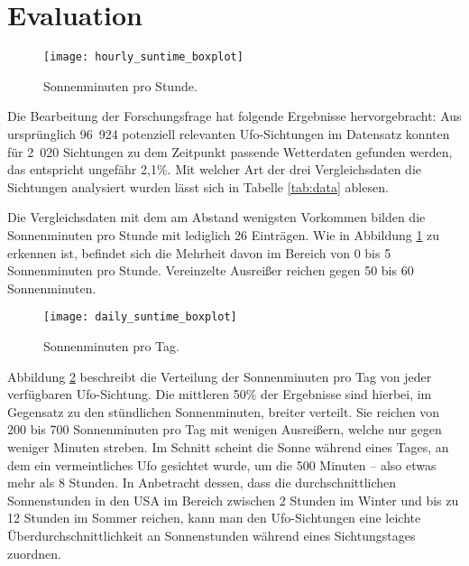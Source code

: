 \section{Evaluation} \label{evaluation}

\begin{figure}[t]
    \centering
    \texttt{[image: hourly\_suntime\_boxplot]}
    \caption{Sonnenminuten pro Stunde.}
    \label{fig:hourly_suntime}
\end{figure}

Die Bearbeitung der Forschungsfrage hat folgende Ergebnisse hervorgebracht: Aus ursprünglich 96~924 potenziell relevanten Ufo-Sichtungen im Datensatz konnten für 2~020 Sichtungen zu dem Zeitpunkt passende Wetterdaten gefunden werden, das entspricht ungefähr 2,1\%. Mit welcher Art der drei Vergleichsdaten die Sichtungen analysiert wurden lässt sich in Tabelle \ref{tab:data} ablesen.

Die Vergleichsdaten mit dem am Abstand wenigsten Vorkommen bilden die Sonnenminuten pro Stunde mit lediglich 26 Einträgen. Wie in Abbildung \ref{fig:hourly_suntime} zu erkennen ist, befindet sich die Mehrheit davon im Bereich von 0 bis 5 Sonnenminuten pro Stunde. Vereinzelte Ausreißer reichen gegen 50 bis 60 Sonnenminuten. 

\begin{figure}[t]
    \centering
    \texttt{[image: daily\_suntime\_boxplot]}
    \caption{Sonnenminuten pro Tag.}
    \label{fig:daily_suntime}
\end{figure}

Abbildung \ref{fig:daily_suntime} beschreibt die Verteilung der Sonnenminuten pro Tag von jeder verfügbaren Ufo-Sichtung. Die mittleren 50\% der Ergebnisse sind hierbei, im Gegensatz zu den stündlichen Sonnenminuten, breiter verteilt. Sie reichen von 200 bis 700 Sonnenminuten pro Tag mit wenigen Ausreißern, welche nur gegen weniger Minuten streben. Im Schnitt scheint die Sonne während eines Tages, an dem ein vermeintliches Ufo gesichtet wurde, um die 500 Minuten -- also etwas mehr als 8 Stunden. In Anbetracht dessen, dass die durchschnittlichen Sonnenstunden in den USA im Bereich zwischen 2 Stunden im Winter und bis zu 12 Stunden im Sommer reichen, kann man den Ufo-Sichtungen eine leichte Überdurchschnittlichkeit an Sonnenstunden während eines Sichtungstages zuordnen\cite{statista:2021}.

